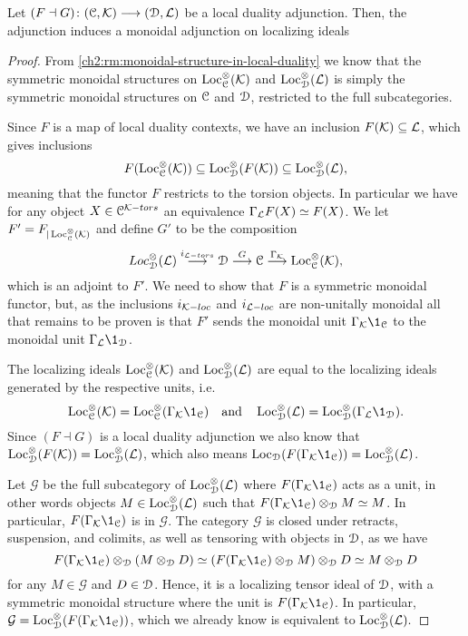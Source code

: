 \begin{lemma}
    \label{ch2:lm:induced-torsion-adjunction}
    Let $(F\dashv G)\colon (\EuScript{C}, \mathcal{K})\longrightarrow (\EuScript{D}, \mathcal{L})$ be a local duality adjunction. Then, the adjunction induces a monoidal adjunction on localizing ideals
    \begin{center}
    \end{center}
\end{lemma}
\begin{proof}
    From \cref{ch2:rm:monoidal-structure-in-local-duality} we know that the symmetric monoidal structures on $\operatorname{Loc}^\otimes_{\EuScript{C}}(\mathcal{K})$ and $\operatorname{Loc}^\otimes_{\EuScript{D}}(\mathcal{L})$ is simply the symmetric monoidal structures on $\EuScript{C}$ and $\EuScript{D}$, restricted to the full subcategories. 
    
    Since $F$ is a map of local duality contexts, we have an inclusion $F(\mathcal{K})\subseteq \mathcal{L}$, which gives inclusions  
    $$F(\operatorname{Loc}^\otimes_{\EuScript{C}}(\mathcal{K}))\subseteq \operatorname{Loc}^\otimes_{\EuScript{D}}(F(\mathcal{K}))\subseteq \operatorname{Loc}^\otimes_{\EuScript{D}}(\mathcal{L}),$$
    meaning that the functor $F$ restricts to the torsion objects. In particular we have for any object $X\in \EuScript{C}^{\mathcal{K}-tors}$ an equivalence $\Gamma_{\mathcal{L}} F(X) \simeq F(X)$. We let $F'=F_{|\operatorname{Loc}^\otimes_{\EuScript{C}}(\mathcal{K})}$ and define $G'$ to be the composition 
    $$Loc^{\otimes}_{\EuScript{D}}(\mathcal{L})\overset{i_{\mathcal{L}-tors}}\longrightarrow \EuScript{D}\overset{G}\longrightarrow \EuScript{C}\overset{\Gamma_{\mathcal{K}}}\longrightarrow \operatorname{Loc}_{\EuScript{C}}^{\otimes}(\mathcal{K}),$$
    which is an adjoint to $F'$. We need to show that $F$ is a symmetric monoidal functor, but, as the inclusions $i_{\mathcal{K}-loc}$ and $i_{\mathcal{L}-loc}$ are non-unitally monoidal all that remains to be proven is that $F'$ sends the monoidal unit $\Gamma_\K \1_\C$ to the monoidal unit $\Gamma_\L \1_\D$. 

    The localizing ideals $\operatorname{Loc}_{\EuScript{C}}^\otimes(\mathcal{K})$ and $\operatorname{Loc}_{\EuScript{D}}^\otimes(\mathcal{L})$ are equal to the localizing ideals generated by the respective units, i.e. 
    $$\Loc_\C^\otimes(\K) = \Loc_\C^\otimes(\Gamma_\K\1_\C) \quad \text{and}\quad \Loc_\D^\otimes(\L) = \Loc_\D^\otimes(\Gamma_\L\1_\D).$$
    Since $(F\dashv G)$ is a local duality adjunction we also know that $\operatorname{Loc}^\otimes_{\EuScript{D}}(F(\mathcal{K}))= \operatorname{Loc}_{\EuScript{D}}^\otimes(\mathcal{L})$, which also means $\Loc_\D(F(\Gamma_\K \1_\C)) = \Loc_\D^\otimes(\L)$.

    Let $\mathcal{G}$ be the full subcategory of $\operatorname{Loc}_{\EuScript{D}}^\otimes(\mathcal{L})$ where $F(\Gamma_\K\1_\C)$ acts as a unit, in other words objects $M\in \operatorname{Loc}_{\EuScript{D}}^\otimes(\mathcal{L})$ such that $F(\Gamma_\K\1_\C)\otimes_{\D} M\simeq M$. In particular, $F(\Gamma_\K\1_\C)$ is in $\mathcal{G}$. The category $\mathcal{G}$ is closed under retracts, suspension, and colimits, as well as tensoring with objects in $\EuScript{D}$, as we have 
    $$F(\Gamma_\K\1_\C) \otimes_\D (M\otimes_\D D)\simeq (F(\Gamma_\K\1_\C)\otimes_\D M) \otimes_\D D \simeq M\otimes_\D D$$
    for any $M\in \mathcal{G}$ and $D\in \EuScript{D}$. Hence, it is a localizing tensor ideal of $\EuScript{D}$, with a symmetric monoidal structure where the unit is $F(\Gamma_\K\1_\C)$. In particular, $\mathcal{G} = \Loc_\D^\otimes(F(\Gamma_\K\1_\C))$, which we already know is equivalent to $\operatorname{Loc}_{\EuScript{D}}^\otimes(\mathcal{L}).$
    

\end{proof}
